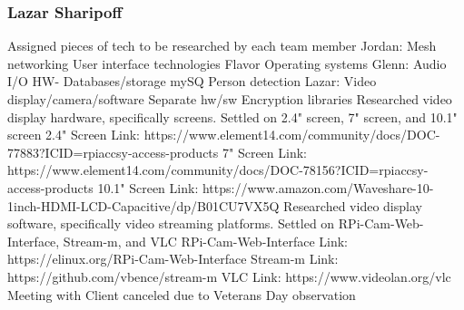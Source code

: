 \documentclass[onecolumn, draftclsnofoot,10pt, compsoc]{IEEEtran}
\newcommand\tab[1][1cm]{\hspace*{#1}}
\begin{document}
\subsubsection{Lazar Sharipoff}
Assigned pieces of tech to be researched by each team member
\newline \tab Jordan:
\newline \tab \tab Mesh networking
\newline \tab \tab User interface technologies
\newline \tab \tab Flavor Operating systems
\newline \tab Glenn:
\newline \tab \tab Audio I/O HW-
\newline \tab \tab Databases/storage mySQ
\newline \tab \tab Person detection
\newline \tab Lazar:
\newline \tab \tab Video display/camera/software
\newline \tab \tab Separate hw/sw
\newline \tab \tab Encryption libraries		
\newline Researched video display hardware, specifically screens.
\newline Settled on 2.4" screen, 7" screen, and 10.1" screen
\newline \tab 2.4" Screen Link:
\newline \tab \tab https://www.element14.com/community/docs/DOC-77883?ICID=rpiaccsy-access-products
\newline \tab 7" Screen Link:
\newline \tab \tab https://www.element14.com/community/docs/DOC-78156?ICID=rpiaccsy-access-products
\newline \tab 10.1" Screen Link:
\newline \tab \tab https://www.amazon.com/Waveshare-10-1inch-HDMI-LCD-Capacitive/dp/B01CU7VX5Q
\newline  Researched video display software, specifically video streaming platforms. \newline Settled on RPi-Cam-Web-Interface, Stream-m, and VLC
\newline \tab RPi-Cam-Web-Interface Link:
\newline \tab \tab https://elinux.org/RPi-Cam-Web-Interface
\newline \tab Stream-m Link:
\newline \tab \tab https://github.com/vbence/stream-m
\newline \tab VLC Link:
\newline \tab \tab https://www.videolan.org/vlc	
\newline Meeting with Client canceled due to Veterans Day observation
\end{document}
